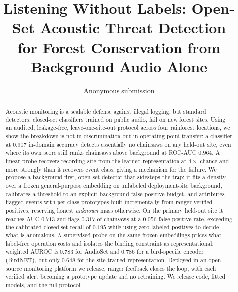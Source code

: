 \documentclass[letterpaper]{article} %
\title{Listening Without Labels: Open-Set Acoustic Threat Detection\\
for Forest Conservation from Background Audio Alone}
\author{Anonymous submission}
\begin{document}
\maketitle

\begin{abstract}
Acoustic monitoring is a scalable defense against illegal logging, but standard detectors, closed-set classifiers trained on public audio, fail on new forest sites. Using an audited, leakage-free, leave-one-site-out protocol across four rainforest locations, we show the breakdown is not in discrimination but in operating-point transfer: a classifier at $0.907$ in-domain accuracy detects essentially no chainsaws on any held-out site, even where its own score still ranks chainsaws above background at ROC-AUC $0.964$. A linear probe recovers recording site from the learned representation at $4\times$ chance and more strongly than it recovers event class, giving a mechanism for the failure. We propose a background-first, open-set detector that sidesteps the trap: it fits a density over a frozen general-purpose embedding on unlabeled deployment-site background, calibrates a threshold to an explicit background false-positive budget, and attributes flagged events with per-class prototypes built incrementally from ranger-verified positives, reserving honest \emph{unknown} mass otherwise. On the primary held-out site it reaches AUC $0.713$ and flags $0.317$ of chainsaws at a $0.056$ false-positive rate, exceeding the calibrated closed-set recall of $0.195$ while using zero labeled positives to decide what is anomalous. A supervised probe on the same frozen embeddings prices what label-free operation costs and isolates the binding constraint as representational: weighted AUROC is $0.783$ for AudioSet and $0.786$ for a bird-specific encoder (BirdNET), but only $0.648$ for the site-trained representation. Deployed in an open-source monitoring platform we release, ranger feedback closes the loop, with each verified alert becoming a prototype update and no retraining. We release code, fitted models, and the full protocol.
\end{abstract}











% 
\end{document}
